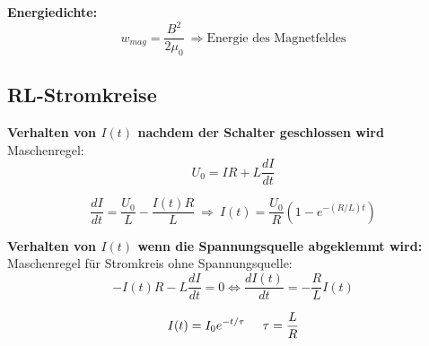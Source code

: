 \textbf{Energiedichte:}
\[
    w_{mag} = \frac{B^2}{2\mu_0} \ \Rightarrow \text{Energie des Magnetfeldes}
\]

\subsection{RL-Stromkreise}
\textbf{Verhalten von $I(t)$ nachdem der Schalter geschlossen wird} \\
\hspace{5mm} Maschenregel:
\[
    U_0 = IR + L\frac{dI}{dt}
\]
\begin{formulabox}
    \[
        \frac{dI}{dt} = \frac{U_0}{L} - \frac{I(t)R}{L} \ \Rightarrow \ I(t) = \frac{U_0}{R}\left( 1 - e^{-(R/L)t} \right)
    \]
\end{formulabox}

\textbf{Verhalten von $I(t)$ wenn die Spannungsquelle abgeklemmt wird:} \\
\hspace{5mm} Maschenregel für Stromkreis ohne Spannungsquelle:
\[
    -I(t)R - L\frac{dI}{dt} = 0 \iff \frac{dI(t)}{dt} = -\frac{R}{L}I(t)
\]
\begin{formulabox}
    \[
        I(t) = I_0 e^{-t/\tau} \hspace{5mm} \tau = \frac{L}{R}
    \]
\end{formulabox}
